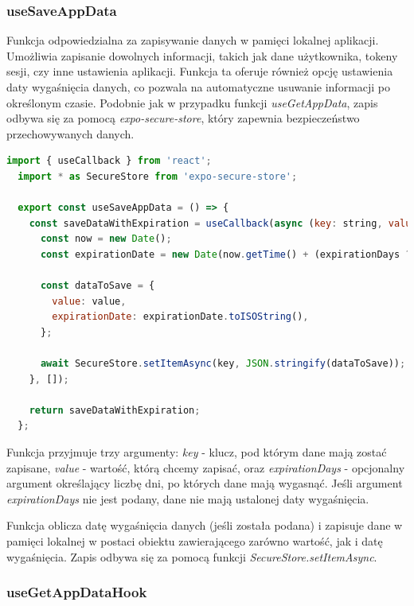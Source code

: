 \subsubsection{useSaveAppData} 

Funkcja odpowiedzialna za zapisywanie danych w pamięci lokalnej aplikacji. Umożliwia zapisanie dowolnych informacji, takich jak dane użytkownika, tokeny sesji, czy inne ustawienia aplikacji. Funkcja ta oferuje również opcję ustawienia daty wygaśnięcia danych, co pozwala na automatyczne usuwanie informacji po określonym czasie. Podobnie jak w przypadku funkcji \textit{useGetAppData}, zapis odbywa się za pomocą \textit{expo-secure-store}, który zapewnia bezpieczeństwo przechowywanych danych.

\begin{lstlisting}[language=JavaScript, caption=useSaveAppDataHook, label=lst:hook_data]
  import { useCallback } from 'react';
  import * as SecureStore from 'expo-secure-store';
  
  export const useSaveAppData = () => {
    const saveDataWithExpiration = useCallback(async (key: string, value: string, expirationDays?: number) => {
      const now = new Date();
      const expirationDate = new Date(now.getTime() + (expirationDays ? expirationDays * 24 * 60 * 60 * 1000 : 0));

      const dataToSave = {
        value: value,
        expirationDate: expirationDate.toISOString(),
      };

      await SecureStore.setItemAsync(key, JSON.stringify(dataToSave));
    }, []);

    return saveDataWithExpiration;
  };
\end{lstlisting}
    
Funkcja przyjmuje trzy argumenty: \textit{key} - klucz, pod którym dane mają zostać zapisane, \textit{value} - wartość, którą chcemy zapisać, oraz \textit{expirationDays} - opcjonalny argument określający liczbę dni, po których dane mają wygasnąć. Jeśli argument \textit{expirationDays} nie jest podany, dane nie mają ustalonej daty wygaśnięcia. 

Funkcja oblicza datę wygaśnięcia danych (jeśli została podana) i zapisuje dane w pamięci lokalnej w postaci obiektu zawierającego zarówno wartość, jak i datę wygaśnięcia. Zapis odbywa się za pomocą funkcji \textit{SecureStore.setItemAsync}.

\subsubsection{useGetAppDataHook}

